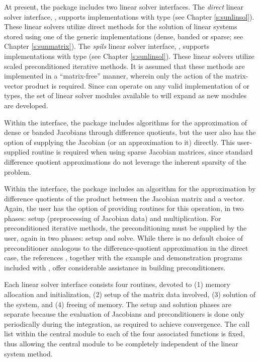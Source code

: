 At present, the package includes two linear solver interfaces.  The
{\em direct} linear solver interface, {\idadls}, supports {\sunlinsol}
implementations with type  (see Chapter
\ref{s:sunlinsol}).  These linear solvers utilize direct methods for
the solution of linear systems stored using one of the {\sundials} generic
{\sunmatrix} implementations (dense, banded or sparse; see
Chapter \ref{s:sunmatrix}).  
The {\em spils} linear solver interface, {\idaspils}, supports
{\sunlinsol} implementations with type 
(see Chapter \ref{s:sunlinsol}).  These linear solvers utilize scaled
preconditioned iterative methods.  It is assumed that these methods
are implemented in a ``matrix-free'' manner, wherein only the action
of the matrix-vector product is required.  Since {\ida} can
operate on any valid {\sunlinsol} implementation of
 or  types, the set of
linear solver modules available to {\ida} will expand as new
{\sunlinsol} modules are developed.

Within the {\idadls} interface, the package includes algorithms for the
approximation of dense or banded Jacobians through difference 
quotients, but the user also has the option of supplying the Jacobian
(or an approximation to it) directly.  This user-supplied 
routine is required when using sparse Jacobian matrices, since
standard difference quotient approximations do not leverage the
inherent sparsity of the problem.

Within the {\idaspils} interface, the package includes an algorithm for
the approximation by difference quotients of the product between the Jacobian
matrix and a vector. Again,
the user has the option of providing routines for this operation, in
two phases: setup (preprocessing of Jacobian data) and multiplication.
For preconditioned iterative methods,  
the preconditioning must be supplied by the user, again in two phases: 
setup and solve.  While there is no
default choice of preconditioner analogous to the difference-quotient
approximation in the direct case, the references
\cite{BrHi:89,Byr:92}, together with the example and demonstration
programs included with {\cvode}, offer considerable assistance in
building preconditioners. 

Each {\ida} linear solver interface consists four routines, devoted to
(1) memory allocation and initialization, (2) setup of the matrix data
involved, (3) solution of the system, and (4) freeing of memory.  
The setup and solution phases are separate because the evaluation of
Jacobians and preconditioners is done only periodically during the
integration, as required to achieve convergence. The call list within
the central {\ida} module to each of the four associated functions is
fixed, thus allowing the central module to be completely independent
of the linear system method.

